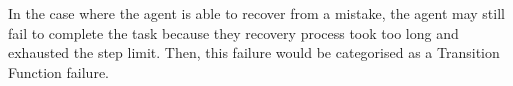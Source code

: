 In the case where the agent is able to recover from a mistake, the agent may still fail to complete the task because they recovery process took too long and exhausted the step limit. Then, this failure would be categorised as a Transition Function failure. 



